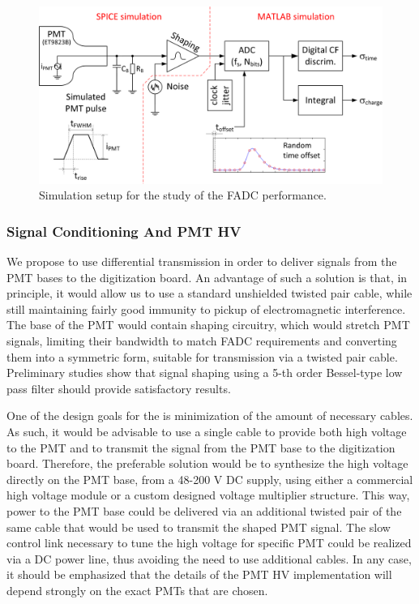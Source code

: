 \begin{figure}[hptb]
\centering
  \includegraphics[width=0.7\linewidth]{figures/fadc_sim_setup.png}
  \caption{Simulation setup for the study of the FADC performance.}
\label{fig:fadcSimSetup}
\end{figure}

\subsubsection{Signal Conditioning And PMT HV}\label{fadc_signal_conditioning}

We propose to use differential transmission in order to deliver signals from the PMT bases to the digitization board. An advantage of such a solution is that, in principle, it would allow us to use a standard unshielded twisted pair cable, while still maintaining fairly good immunity to pickup of electromagnetic interference. The base of the PMT would contain shaping circuitry, which would stretch PMT signals, limiting their bandwidth to match FADC requirements and converting them into a symmetric form, suitable for transmission via a twisted pair cable. Preliminary studies show that signal shaping using a 5-th order Bessel-type low pass filter should provide satisfactory results. 

One of the design goals for the \nuprism is minimization of the amount of necessary cables. As such, it would be advisable to use a single cable to provide both high voltage to the PMT and to transmit the signal from the PMT base to the digitization board. Therefore, the preferable solution would be to synthesize the high voltage directly on the PMT base, from a 48-200 V DC supply, using either a commercial high voltage module or a custom designed voltage multiplier structure. This way, power to the PMT base could be delivered via an additional twisted pair of the same cable that would be used to transmit the shaped PMT signal. The slow control link necessary to tune the high voltage for specific PMT could be realized via a DC power line, thus avoiding the need to use additional cables. In any case, it should be emphasized that the details of the PMT HV implementation will depend strongly on the exact PMTs that are chosen.


